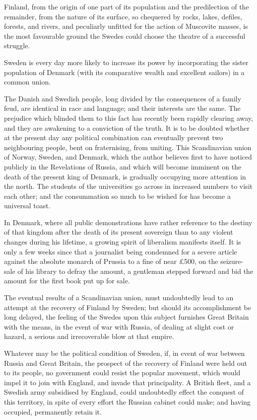 \documentclass[11pt,a4paper]{article}
\begin{document}
Finland, from the origin of one part of its population and the predilection of the remainder, from the nature of its surface, so chequered by rocks, lakes, defiles, forests, and rivers, and peculiarly unfitted for the action of Muscovite masses, is the most favourable ground the Swedes could choose the theatre of a successful struggle.

Sweden is every day more likely to increase its power by incorporating the sister population of Denmark (with its comparative wealth and excellent sailors) in a common union.

The Danish and Swedish people, long divided by the consequences of a family feud, are identical in race and language; and their interests are the same. The prejudice which blinded them to this fact has recently been rapidly clearing away, and they are awakening to a conviction of the truth. It is to be doubted whether at the present day any political combination can eventually prevent two neighbouring people, bent on fraternising, from uniting. This Scandinavian union of Norway, Sweden, and Denmark, which the author believes first to have noticed publicly in the Revelations of Russia, and which will become imminent on the death of the present king of Denmark, is gradually occupying more attention in the north. The students of the universities go across in increased numbers to visit each other; and the consummation so much to be wished for has become a universal toast.

In Denmark, where all public demonstrations have rather reference to the destiny of that kingdom after the death of its present sovereign than to any violent changes during his lifetime, a growing spirit of liberalism manifests itself. It is only a few weeks since that a journalist being condemned for a severe article against the absolute monarch of Prussia to a fine of near £500, on the seizure-sale of his library to defray the amount, a gentleman stepped forward and bid the amount for the first book put up for sale.

The eventual results of a Scandinavian union, must undoubtedly lead to an attempt at the recovery of Finland by Sweden; but should its accomplishment be long delayed, the feeling of the Swedes upon this subject furnishes Great Britain with the means, in the event of war with Russia, of dealing at slight cost or hazard, a serious and irrecoverable blow at that empire.

Whatever may be the political condition of Sweden, if, in event of war between Russia and Great Britain, the prospect of the recovery of Finland were held out to its people, no government could resist the popular movement, which would impel it to join with England, and invade that principality. A British fleet, and a Swedish army subsidised by England, could undoubtedly effect the conquest of this territory, in spite of every effort the Russian cabinet could make; and having occupied, permanently retain it.
\end{document}
